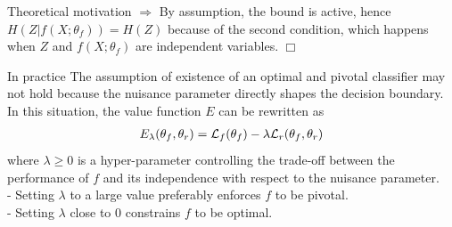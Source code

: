 \documentclass[final,unknownkeysallowed]{beamer}
\newcommand{\qedwhite}{\hfill \ensuremath{\Box}}
\begin{document}
\begin{frame}{}
\begin{textblock}{0.32}
\begin{block}{Theoretical motivation \phantom{p}}
$\Rightarrow$ By assumption, the bound is active, hence $H(Z|f(X;\theta_f)) = H(Z)$
because of the second condition, which happens when $Z$ and $f(X;\theta_f)$
are independent variables.
\qedwhite

\end{block}

\vspace{0.2cm}
\begin{block}{In practice\phantom{p}}
The assumption of existence of an optimal and pivotal classifier may
not hold because the nuisance parameter directly shapes the decision boundary.
In this situation, the value function $E$ can be rewritten  as
\begin{align}
E_\lambda(\theta_f, \theta_r) = {\cal L}_f(\theta_f) - \lambda {\cal L}_r(\theta_f, \theta_r)
\end{align}
where $\lambda \geq 0$ is a hyper-parameter controlling the trade-off between
the performance of $f$ and its independence with respect to the nuisance
parameter. \\
- Setting $\lambda$ to a large value preferably enforces $f$ to be pivotal.\\
- Setting $\lambda$ close to $0$ constrains $f$ to be optimal.
\end{block}


\end{textblock}
\end{frame}
\end{document}
